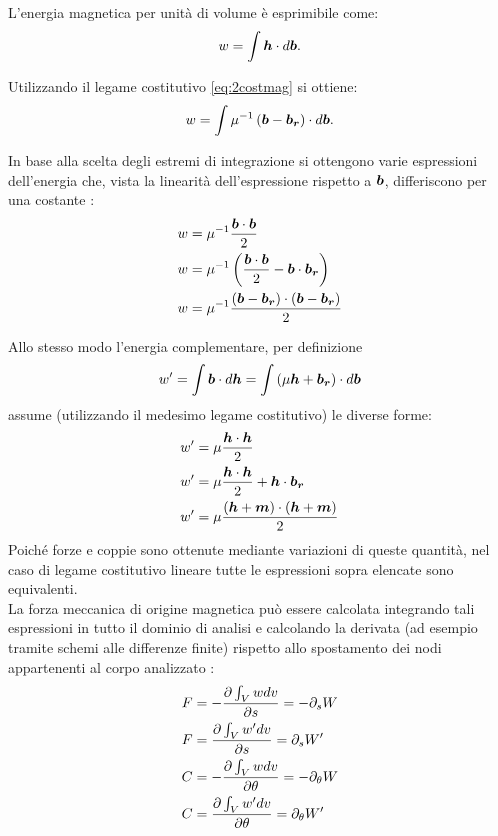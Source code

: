 L'energia magnetica per unità di volume è esprimibile come:
\begin{equation}
w = \int \boldsymbol{h}\cdot d\boldsymbol{b}. 
\label{eq:5en1}
\end{equation}

Utilizzando il legame costitutivo \eqref{eq:2costmag} si ottiene:
\begin{equation}
w = \int \mu^{-1}\left(\boldsymbol{b}-\boldsymbol{b_r}\right) \cdot d\boldsymbol{b}. 
\label{eq:5en2}
\end{equation}

In base alla scelta degli estremi di integrazione si ottengono varie espressioni dell'energia che, vista la linearità dell'espressione rispetto a $\boldsymbol{b}$, differiscono per una costante \citep{henrotte_computation_2004}:
\begin{align}
\label{eq:5en3}
w &= \mu^{-1}\frac{\boldsymbol{b}\cdot\boldsymbol{b}}{2}\\
\label{eq:5en4}
w &= \mu^{-1}\left(\frac{\boldsymbol{b}\cdot\boldsymbol{b}}{2}-\boldsymbol{b}\cdot\boldsymbol{b_r}\right)\\
\label{eq:5en5}
w &= \mu^{-1}\frac{\left(\boldsymbol{b}-\boldsymbol{b_r}\right)\cdot\left(\boldsymbol{b}-\boldsymbol{b_r}\right)}{2}
\end{align}

Allo stesso modo l'energia complementare, per definizione
\begin{equation}
w' = \int \boldsymbol{b}\cdot d\boldsymbol{h} = \int \left(\mu\boldsymbol{h}+\boldsymbol{b_r}\right) \cdot d\boldsymbol{b}
\label{eq:5enc1}
\end{equation}
assume (utilizzando il medesimo legame costitutivo) le diverse forme:
\begin{align}
\label{eq:5enc3}
w' &= \mu\frac{\boldsymbol{h}\cdot\boldsymbol{h}}{2}\\
\label{eq:5enc4}
w' &= \mu\frac{\boldsymbol{h}\cdot\boldsymbol{h}}{2}+\boldsymbol{h}\cdot\boldsymbol{b_r}\\
\label{eq:5enc5}
w' &= \mu\frac{\left(\boldsymbol{h}+\boldsymbol{m}\right)\cdot\left(\boldsymbol{h}+\boldsymbol{m}\right)}{2}
\end{align}
Poiché forze e coppie sono ottenute mediante variazioni di queste quantità, nel caso di legame costitutivo lineare tutte le espressioni sopra elencate sono equivalenti.\\

La forza meccanica di origine magnetica può essere calcolata integrando tali espressioni in tutto il dominio di analisi e calcolando la derivata (ad esempio tramite schemi alle differenze finite) rispetto allo spostamento dei nodi appartenenti al corpo analizzato :
\begin{align}
\label{eq:5fplv1_a}
F &= -\frac{\partial\int_V w dv}{\partial s} = -\partial_s W\\
\label{eq:5fplv1_b}
F &= \frac{\partial\int_V w' dv}{\partial s} = \partial_s W'\\
\label{eq:5fplv1_c}
C &= -\frac{\partial\int_V w dv}{\partial \theta} = -\partial_{\theta} W\\
\label{eq:5fplv1_d}
C &= \frac{\partial\int_V w' dv}{\partial \theta} = \partial_{\theta} W'\\
\end{align}

